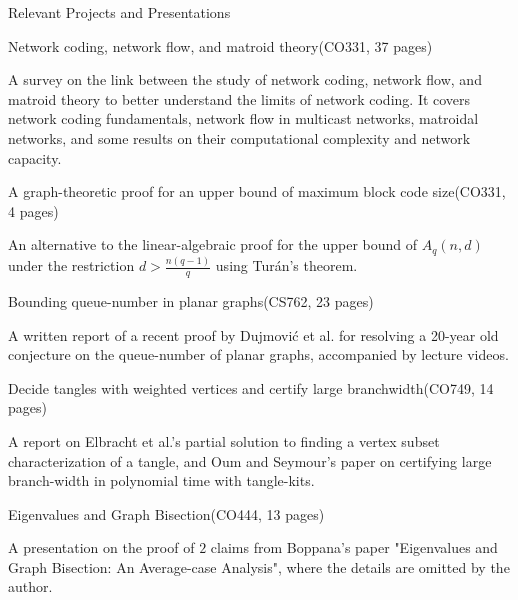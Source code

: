 \documentclass{cv}
\begin{document}
\begin{rSection}{Relevant Projects and Presentations}		
	\begin{rSubsection}{Network coding, network flow, and matroid theory}{(CO331, 37 pages)}{}{}
		\item A survey on the link between the study of network coding, network flow, and matroid theory 
		to better understand the limits of network coding. It covers network coding fundamentals, network flow in 
		multicast networks, matroidal networks, and some results on their computational complexity and network capacity.
	\end{rSubsection}
	
	\begin{rSubsection}{A graph-theoretic proof for an upper bound of maximum block code size}{(CO331, 4 pages)}{}{}
		\item An alternative to the linear-algebraic proof for the upper bound of $A_q(n,d)$ under the restriction $d > \frac{n(q-1)}{q}$ using Tur\'{a}n's theorem.
	\end{rSubsection}

	\begin{rSubsection}{Bounding queue-number in planar graphs}{(CS762, 23 pages)}{}{}
		\item A written report of a recent proof by Dujmovi\'{c} et al. for resolving a 20-year old conjecture on the queue-number of planar graphs, 
		accompanied by lecture videos.
	\end{rSubsection}
	
	\begin{rSubsection}{Decide tangles with weighted vertices and certify large branchwidth}{(CO749, 14 pages)}{}{}
		\item A report on Elbracht et al.'s partial solution to finding a vertex subset characterization of a tangle, and Oum and 
		Seymour's paper on certifying large branch-width in polynomial time with tangle-kits.
	\end{rSubsection}
	
	\begin{rSubsection}{Eigenvalues and Graph Bisection}{(CO444, 13 pages)}{}{}
		\item A presentation on the proof of $2$ claims from Boppana's paper "Eigenvalues and Graph Bisection: An Average-case Analysis", 
		where the details are omitted by the author.
	\end{rSubsection}
\end{rSection}	
\end{document}
